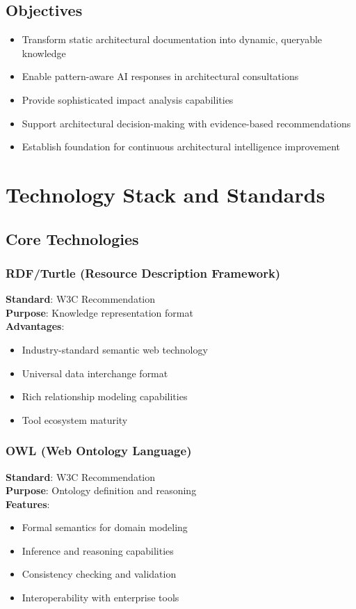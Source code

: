 \documentclass[12pt,a4paper]{article}
\begin{document}
\subsection{Objectives}
\begin{itemize}
    \item Transform static architectural documentation into dynamic, queryable knowledge
    \item Enable pattern-aware AI responses in architectural consultations
    \item Provide sophisticated impact analysis capabilities
    \item Support architectural decision-making with evidence-based recommendations
    \item Establish foundation for continuous architectural intelligence improvement
\end{itemize}

\section{Technology Stack and Standards}

\subsection{Core Technologies}

\subsubsection{RDF/Turtle (Resource Description Framework)}
\textbf{Standard}: W3C Recommendation\\
\textbf{Purpose}: Knowledge representation format\\
\textbf{Advantages}:
\begin{itemize}
    \item Industry-standard semantic web technology
    \item Universal data interchange format
    \item Rich relationship modeling capabilities
    \item Tool ecosystem maturity
\end{itemize}

\subsubsection{OWL (Web Ontology Language)}
\textbf{Standard}: W3C Recommendation\\
\textbf{Purpose}: Ontology definition and reasoning\\
\textbf{Features}:
\begin{itemize}
    \item Formal semantics for domain modeling
    \item Inference and reasoning capabilities
    \item Consistency checking and validation
    \item Interoperability with enterprise tools
\end{itemize}
\end{document}
